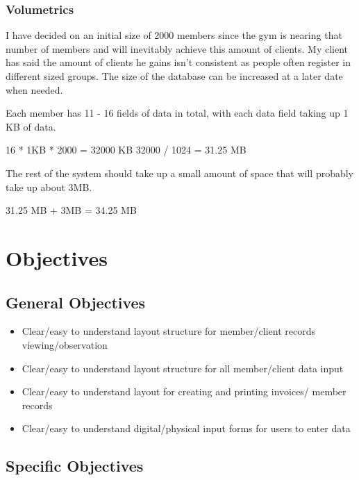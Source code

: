 \subsubsection{Volumetrics}

I have decided on an initial size of 2000 members since the gym is nearing that number of members and will inevitably achieve this amount of clients.  My client has said the amount of clients he gains isn't consistent as people often register in different sized groups. The size of the database can be increased at a later date when needed.  

Each member has 11 - 16 fields of data in total, with each data field taking up 1 KB of data.

16 * 1KB * 2000 = 32000 KB
32000 / 1024 = 31.25 MB

The rest of the system should take up a small amount of space that will probably take up about 3MB.

31.25 MB + 3MB = 34.25 MB

\section{Objectives}

\subsection{General Objectives}

    \begin{itemize}  

        \item Clear/easy to understand layout structure for member/client records viewing/observation 

        \item Clear/easy to understand layout structure for all member/client data input  

        \item Clear/easy to understand layout for creating and printing invoices/ member records
        
        \item Clear/easy to understand digital/physical input forms for users to enter data

    \end{itemize}

\subsection{Specific Objectives}


